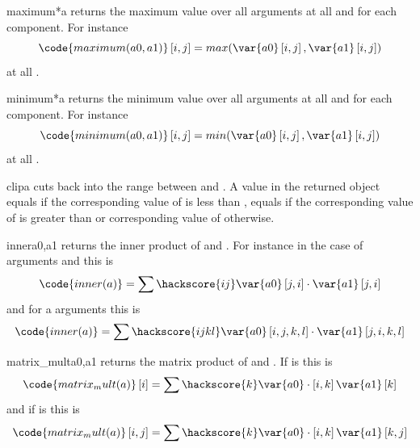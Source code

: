 \begin{funcdesc}{maximum}{*a}
returns the maximum value over all arguments at all \DataSamplePoints and for each component.
For instance 
\begin{equation}
\code{maximum(a0,a1)}\left[i,j\right]=max(\var{a0} \left[i,j\right],\var{a1} \left[i,j\right])
\end{equation}
at all \DataSamplePoints.
\end{funcdesc}
\begin{funcdesc}{minimum}{*a}
returns the minimum value over all arguments at all \DataSamplePoints and for each component.
For instance 
\begin{equation}
\code{minimum(a0,a1)}\left[i,j\right]=min(\var{a0} \left[i,j\right],\var{a1} \left[i,j\right])
\end{equation}
at all \DataSamplePoints.
\end{funcdesc}

\begin{funcdesc}{clip}{a}
cuts back  into the range between  and . A value in the returned object equals 
 if the corresponding value of  is less than , equals  if the 
 corresponding value of  is greater than 
or corresponding value of  otherwise.
\end{funcdesc}
\begin{funcdesc}{inner}{a0,a1}
returns the inner product of  and . For instance in the
case of \RankTwo arguments and this is 
\begin{equation}
\code{inner(a)}=\sum\hackscore{ij}\var{a0} \left[j,i\right]  \cdot \var{a1} \left[j,i\right]
\end{equation} 
and for a \RankFour arguments this is
\begin{equation}
\code{inner(a)}=\sum\hackscore{ijkl}\var{a0} \left[i,j,k,l\right]  \cdot \var{a1} \left[j,i,k,l\right]
\end{equation} 
\end{funcdesc}

\begin{funcdesc}{matrix_mult}{a0,a1}
returns the matrix product of  and . If  is \RankOne this is
\begin{equation}
\code{matrix_mult(a)}\left[i\right]=\sum\hackscore{k}\var{a0}  \cdot \left[i,k\right]\var{a1} \left[k\right]
\end{equation} 
and if  is \RankTwo this is
\begin{equation}
\code{matrix_mult(a)}\left[i,j\right]=\sum\hackscore{k}\var{a0}  \cdot \left[i,k\right]\var{a1} \left[k,j\right]
\end{equation} 
\end{funcdesc}

